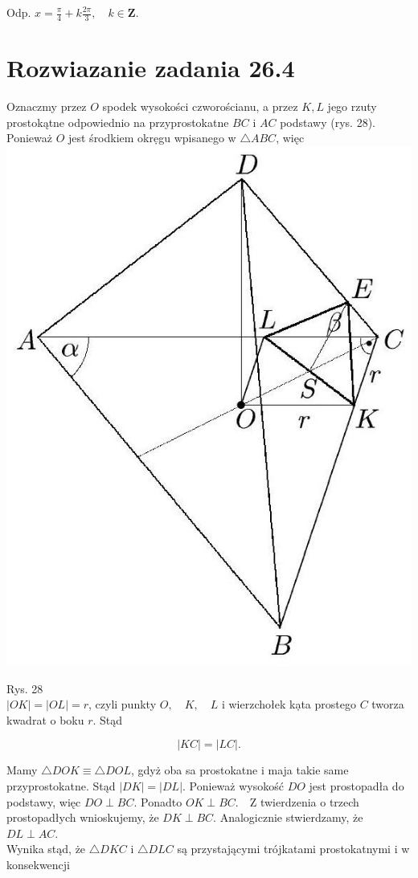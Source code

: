 \documentclass[10pt]{article}
\begin{document}
Odp. $x=\frac{\pi}{4}+k \frac{2 \pi}{3}, \quad k \in \mathbf{Z}$.

\section*{Rozwiazanie zadania 26.4}
Oznaczmy przez $O$ spodek wysokości czworościanu, a przez $K, L$ jego rzuty prostokątne odpowiednio na przyprostokatne $B C$ i $A C$ podstawy (rys. 28). Ponieważ $O$ jest środkiem okrẹgu wpisanego w $\triangle A B C$, więc\\
\includegraphics[max width=\textwidth, center]{2024_11_16_fe5b564401bf7db98894g-123(1)}

Rys. 28\\
$|O K|=|O L|=r$, czyli punkty $O, \quad K, \quad L$ i wierzchołek kạta prostego $C$ tworza kwadrat o boku $r$. Stąd

$$
|K C|=|L C| .
$$

Mamy $\triangle D O K \equiv \triangle D O L$, gdyż oba sa prostokatne i maja takie same przyprostokatne. Stąd $|D K|=|D L|$. Ponieważ wysokość $D O$ jest prostopadła do podstawy, więc $D O \perp B C$. Ponadto $O K \perp B C . \quad \mathrm{Z}$ twierdzenia o trzech prostopadłych wnioskujemy, że $D K \perp B C$. Analogicznie stwierdzamy, że $D L \perp A C$.\\
Wynika stąd, że $\triangle D K C$ i $\triangle D L C$ są przystającymi trójkatami prostokatnymi i w konsekwencji
\end{document}
